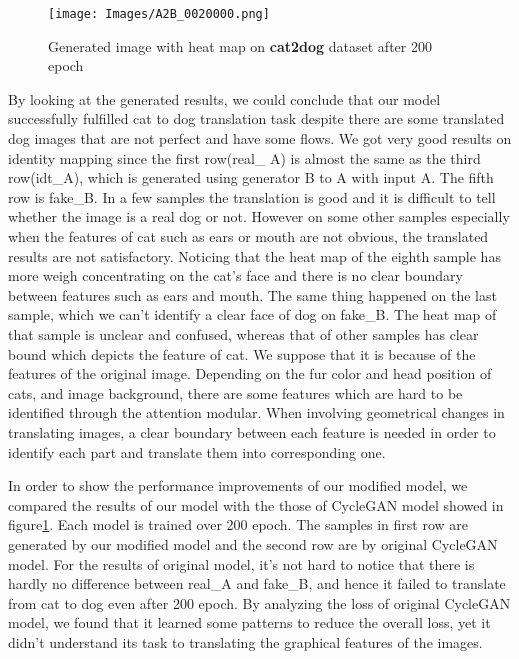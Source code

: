 \documentclass{article}
\begin{document}
\begin{figure}
\centerline{\texttt{[image: Images/A2B\_0020000.png]}}\caption{Generated image with heat map on \textbf{cat2dog} dataset after 200 epoch}
\label{fig:cat2dog}
\end{figure} 
By looking at the generated results, we could conclude that our model successfully fulfilled cat to dog translation task despite there are some translated dog images that are not perfect and have some flows. We got very good results on identity mapping since the first row(real\_ A) is almost the same as the third row(idt\_A), which is generated using generator B to A with input A. The fifth row is fake\_B. In a few samples the translation is good and it is difficult to tell whether the image is a real dog or not. However on some other samples especially when the features of cat such as ears or mouth are not obvious, the translated results are not satisfactory. Noticing that the heat map of the eighth sample has more weigh concentrating on the cat's face and there is no clear boundary between features such as ears and mouth. The same thing happened on the last sample, which we can't identify a clear face of dog on fake\_B. The heat map of that sample is unclear and confused, whereas that of other samples has clear bound which depicts the feature of cat. We suppose that it is because of the features of the original image. Depending on the fur color and head position of cats, and image background, there are some features which are hard to be identified through the attention modular. When involving geometrical changes in translating images, a clear boundary between each feature is needed in order to identify each part and translate them into corresponding one.

In order to show the performance improvements of our modified model, we compared the results of our model with the those of CycleGAN model showed in figure\ref{fig:cat2dog}. Each model is trained over 200 epoch. The samples in first row are generated by our modified model and the second row are by original CycleGAN model. For the results of original model, it’s not hard to notice that there is hardly no difference between real\_A and fake\_B, and hence it failed to translate from cat to dog even after 200 epoch. By analyzing the loss of original CycleGAN model, we found that it learned some patterns to reduce the overall loss, yet it didn't understand its task to translating the graphical features of the images.
\end{document}
